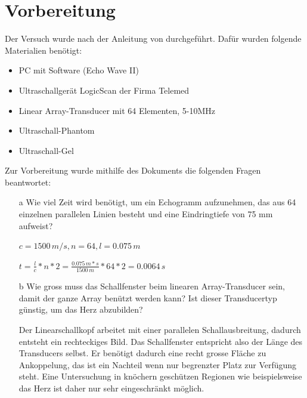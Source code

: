 \documentclass[11pt]{scrartcl}
\begin{document}

    \section{Vorbereitung}
   
    Der Versuch wurde nach der Anleitung von \cite{Echographie} durchgeführt.
    Dafür wurden folgende Materialien benötigt:

    \begin{itemize}
        \item PC mit Software (Echo Wave II)
        \item Ultraschallgerät LogicScan der Firma Telemed
        \item Linear Array-Transducer mit 64 Elementen, 5-10MHz
        \item Ultraschall-Phantom
        \item Ultraschall-Gel
        
    \end{itemize}

    Zur Vorbereitung wurde mithilfe des Dokuments \cite{medUS} die folgenden Fragen beantwortet: %

    \begin{itemize}
        \item[a] Wie viel Zeit wird benötigt, um ein Echogramm aufzunehmen, das aus 64 einzelnen parallelen Linien besteht und eine Eindringtiefe von 75 mm aufweist?
        \item[] $c=1500\,m/s, n=64, l=0.075\,m$
        \item[] $t=\frac{l}{c}*n*2=\frac{0.075\,m*s}{1500\,m}*64*2=0.0064\,s$
        \item[b] Wie gross muss das Schallfenster beim linearen Array-Transducer sein, damit der ganze Array benützt werden kann?
                 Ist dieser Transducertyp günstig, um das Herz abzubilden?
        \item[]  Der Linearschallkopf arbeitet mit einer parallelen Schallausbreitung, dadurch entsteht ein rechteckiges Bild.
        Das Schallfenster entspricht also der Länge des Transducers selbst.
        Er benötigt dadurch eine recht grosse Fläche zu Ankoppelung, das ist ein Nachteil wenn nur begrenzter Platz zur Verfügung steht.
        Eine Untersuchung in knöchern geschützen Regionen wie
        beispielsweise das Herz ist daher nur sehr eingeschränkt möglich.
    \end{itemize}
\end{document}
